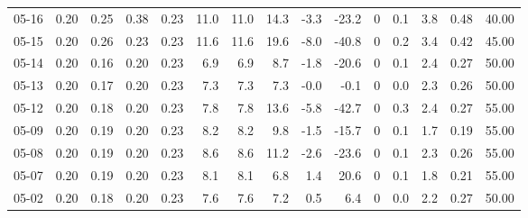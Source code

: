 \begin{threeparttable}
{\begin{tabular}{lrrrrrrrrrrrrrr}
  05-16 &          0.20 &          0.25 &          0.38 &        0.23 &                11.0 &               11.0 &                14.3 &       -3.3 &        -23.2 &              0 &                 0.1 &              3.8 &            0.48 &                  40.00 \\
  05-15 &          0.20 &          0.26 &          0.23 &        0.23 &                11.6 &               11.6 &                19.6 &       -8.0 &        -40.8 &              0 &                 0.2 &              3.4 &            0.42 &                  45.00 \\
  05-14 &          0.20 &          0.16 &          0.20 &        0.23 &                 6.9 &                6.9 &                 8.7 &       -1.8 &        -20.6 &              0 &                 0.1 &              2.4 &            0.27 &                  50.00 \\
  05-13 &          0.20 &          0.17 &          0.20 &        0.23 &                 7.3 &                7.3 &                 7.3 &       -0.0 &         -0.1 &              0 &                 0.0 &              2.3 &            0.26 &                  50.00 \\
  05-12 &          0.20 &          0.18 &          0.20 &        0.23 &                 7.8 &                7.8 &                13.6 &       -5.8 &        -42.7 &              0 &                 0.3 &              2.4 &            0.27 &                  55.00 \\
  05-09 &          0.20 &          0.19 &          0.20 &        0.23 &                 8.2 &                8.2 &                 9.8 &       -1.5 &        -15.7 &              0 &                 0.1 &              1.7 &            0.19 &                  55.00 \\
  05-08 &          0.20 &          0.19 &          0.20 &        0.23 &                 8.6 &                8.6 &                11.2 &       -2.6 &        -23.6 &              0 &                 0.1 &              2.3 &            0.26 &                  55.00 \\
  05-07 &          0.20 &          0.19 &          0.20 &        0.23 &                 8.1 &                8.1 &                 6.8 &        1.4 &         20.6 &              0 &                 0.1 &              1.8 &            0.21 &                  55.00 \\
  05-02 &          0.20 &          0.18 &          0.20 &        0.23 &                 7.6 &                7.6 &                 7.2 &        0.5 &          6.4 &              0 &                 0.0 &              2.2 &            0.27 &                  50.00 \\

\end{tabular}}
\end{threeparttable}

